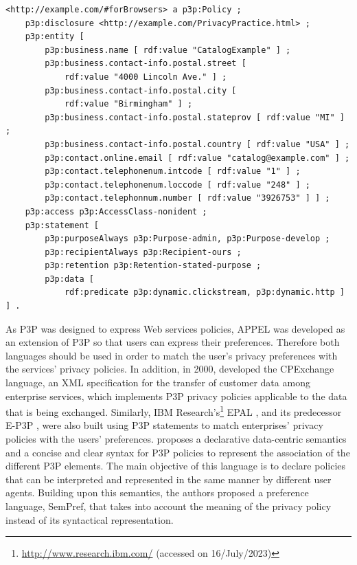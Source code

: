 \begin{listing}
\caption{P3P policy adapted from Example 3.1 of the P3P specification \citep{cranor_platform_2002}, which specifies the privacy policy of CatalogExample for Browsers.}
\label{list:p3p_example}
\begin{verbatim}
<http://example.com/#forBrowsers> a p3p:Policy ;
    p3p:disclosure <http://example.com/PrivacyPractice.html> ;
    p3p:entity [
        p3p:business.name [ rdf:value "CatalogExample" ] ;
        p3p:business.contact-info.postal.street [
            rdf:value "4000 Lincoln Ave." ] ;
        p3p:business.contact-info.postal.city [
            rdf:value "Birmingham" ] ;
        p3p:business.contact-info.postal.stateprov [ rdf:value "MI" ] ;
        p3p:business.contact-info.postal.country [ rdf:value "USA" ] ;
        p3p:contact.online.email [ rdf:value "catalog@example.com" ] ;
        p3p:contact.telephonenum.intcode [ rdf:value "1" ] ;
        p3p:contact.telephonenum.loccode [ rdf:value "248" ] ;
        p3p:contact.telephonnum.number [ rdf:value "3926753" ] ] ;
    p3p:access p3p:AccessClass-nonident ;
    p3p:statement [
        p3p:purposeAlways p3p:Purpose-admin, p3p:Purpose-develop ;
        p3p:recipientAlways p3p:Recipient-ours ;
        p3p:retention p3p:Retention-stated-purpose ;
        p3p:data [
            rdf:predicate p3p:dynamic.clickstream, p3p:dynamic.http ] ] .
\end{verbatim}
\end{listing}

As P3P was designed to express Web services policies, APPEL \citep{cranor_p3p_2002} was developed as an extension of P3P so that users can express their preferences.
Therefore both languages should be used in order to match the user's privacy preferences with the services' privacy policies.
In addition, in 2000, \cite{bohrer_customer_2000} developed the CPExchange language, an XML specification for the transfer of customer data among enterprise services, which implements P3P privacy policies applicable to the data that is being exchanged. Similarly, IBM Research's\footnote{\url{http://www.research.ibm.com/} (accessed on 16/July/2023)} EPAL \citep{ashley_enterprise_2003}, and its predecessor E-P3P \citep{ashley_e-p3p_2002}, were also built using P3P statements to match enterprises' privacy policies with the users' preferences.
\cite{li_semantics-base_2006} proposes a declarative data-centric semantics and a concise and clear syntax for P3P policies to represent the association of the different P3P elements. The main objective of this language is to declare policies that can be interpreted and represented in the same manner by different user agents. Building upon this semantics, the authors proposed a preference language, SemPref, that takes into account the meaning of the privacy policy instead of its syntactical representation.

